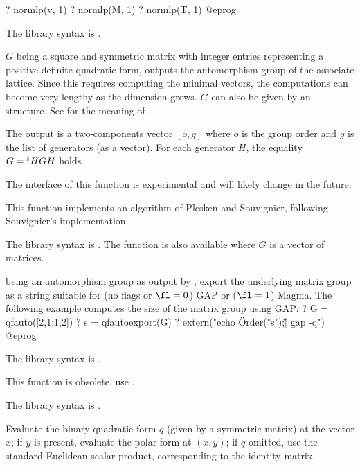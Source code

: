 ? normlp(v, 1)
? normlp(M, 1)
? normlp(T, 1)
@eprog

The library syntax is .

\label{se:qfauto}
$G$ being a square and symmetric matrix with integer entries representing a
positive definite quadratic form, outputs the automorphism group of the
associate lattice.
Since this requires computing the minimal vectors, the computations can
become very lengthy as the dimension grows. $G$ can also be given by an
 structure.
See  for the meaning of .

The output is a two-components vector $[o,g]$ where $o$ is the group order
and $g$ is the list of generators (as a vector). For each generator $H$,
the equality $G={^t}H\*G\*H$ holds.

The interface of this function is experimental and will likely change in the
future.

This function implements an algorithm of Plesken and Souvignier, following
Souvignier's implementation.

The library syntax is .
The function  is also available
where $G$ is a vector of  matrices.

\label{se:qfautoexport}
 being an automorphism group as output by
, export the underlying matrix group as a string suitable
for (no flags or $\fl=0$) GAP or ($\fl=1$) Magma. The following example
computes the size of the matrix group using GAP:
\bprog
? G = qfauto([2,1;1,2])
? s = qfautoexport(G)
? extern("echo \"Order("s");\" | gap -q")
@eprog

The library syntax is .

\label{se:qfbil}
This function is obsolete, use .

The library syntax is .

\label{se:qfeval}
Evaluate the binary quadratic form $q$ (given by a symmetric matrix)
at the vector $x$; if $y$ is present, evaluate the polar form at $(x,y)$;
if $q$ omitted, use the standard Euclidean scalar product, corresponding to
the identity matrix.

